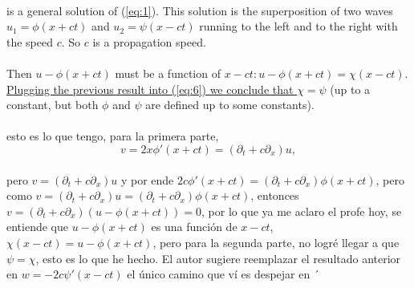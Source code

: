 \documentclass{article}
\begin{document}
\paragraph{} is a general solution of (\ref{eq:1}). This solution is the superposition of two waves $u_1 = \phi(x + ct)$ and $u_2 = \psi(x - ct)$ running to the left and to the right with the speed $c$. So $c$ is a propagation speed.

\newpage
\paragraph{}Then $u-\phi(x+ct)$ must be a function of $x-ct: u-\phi(x+ct)=\chi(x-ct)$. \underline{Plugging the previous result into (\ref{eq:6}) we conclude that $\chi=\psi$} (up to a constant, but both $\phi$ and $\psi$ are defined up to some constants).

\paragraph{} esto es lo que tengo, para la primera parte,
$$v = 2x\phi'(x + ct) = (\partial_t + c \partial_x)u,$$
\paragraph{}pero $v = (\partial_t + c\partial_x)u$ y por ende $2c\phi'(x + ct) = (\partial_t + c\partial_x)\phi(x +ct)$, pero como $v = (\partial_t + c \partial_x)u = (\partial_t + c\partial_x)\phi(x +ct)$, entonces $v = (\partial_t + c\partial_x)(u - \phi(x + ct)) = 0$, por lo que ya me aclaro el profe hoy, se entiende que  $u - \phi(x + ct)$ es una función de $x - ct$, $\chi(x - ct) = u - \phi(x + ct)$, pero para la segunda parte, no logré llegar a que $\psi = \chi$, esto es lo que he hecho. El autor sugiere reemplazar el resultado anterior en $w = -2c\psi'(x - ct)$ el único camino que ví es despejar en ´
\end{document}
